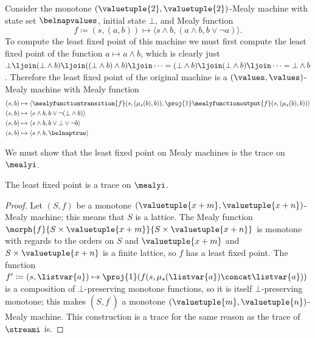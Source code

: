 \documentclass{lmcs}
\begin{document}
\begin{exa}\label{ex:trace-mealy}
    Consider the monotone \((\valuetuple{2},\valuetuple{2})\)-Mealy machine with
    state set \(\belnapvalues\), initial state \(\bot\), and Mealy function \[
        f
        \coloneqq
        (s, (a, b))
        \mapsto
        \langle{s \land b, (a \land b, b \lor \neg a)}\rangle.
    \]
    To compute the least fixed point of this machine we must first compute the
    least fixed point of the function \(a \mapsto a \land b\), which
    is clearly just \(
    \bot
    \ljoin (\bot \land b)
    \ljoin ((\bot \land b) \land b)
    \ljoin \cdots
    =
    (\bot \land b)
    \ljoin (\bot \land b)
    \ljoin \cdots
    = \bot \land b
    \).
    Therefore the least fixed point of the original machine is a
    \((\values, \values)\)-Mealy machine with Mealy function
    \begin{align*}
        (s, b)
         & \mapsto
        \langle{
            \mealyfunctiontransition{f}\mleft(s, \mleft(\mu_{s}\mleft(b\mright), b\mright)\mright),
            \proj{1}\mealyfunctionoutput{f}\mleft(s, \mleft(\mu_{s}\mleft(b\mright), b\mright)\mright)
        }\rangle   \\
        (s, b)
         & \mapsto
        \langle{
            s \land b,
            b \lor \neg \mleft(\bot \land b\mright)
        }\rangle   \\
        (s, b)
         & \mapsto
        \langle{
            s \land b,
            b \lor \bot \lor \neg b
        }\rangle   \\
        (s, b)
         & \mapsto
        \langle{
            s \land b,
            \belnaptrue
        }\rangle
    \end{align*}
\end{exa}

We must show that the least fixed point on Mealy machines is the trace
on \(\mealyi\).

\begin{prop}
    The least fixed point is a trace on \(\mealyi\).
\end{prop}
\begin{proof}
    Let \((S, f)\) be a monotone
    \((\valuetuple{x+m}, \valuetuple{x+n})\)-Mealy machine; this means that
    \(S\) is a lattice.
    The Mealy function \(
    \morph{f}{
        S \times \valuetuple{x+m}
    }{
        S \times \valuetuple{x+n}
    }
    \) is monotone with regards to the orders on \(S\) and
    \(\valuetuple{x+m}\) and \(S \times \valuetuple{x+n}\) is a finite lattice, so
    \(f\) has a least fixed point.
    The function \(
    f^\prime \coloneqq (s, \listvar{a})
    \mapsto
    \proj{1}\mleft(f(s, \mu_{s}(\listvar{a}) \concat \listvar{a})\mright)
    \) is a composition of \(\bot\)-preserving monotone functions, so it is
    itself \(\bot\)-preserving monotone; this makes \((S, f^\prime)\) a monotone
    \((\valuetuple{m}, \valuetuple{n})\)-Mealy machine.
    This construction is a trace for the same reason as the trace of
    \(\streami\) is.
\end{proof}
\end{document}
